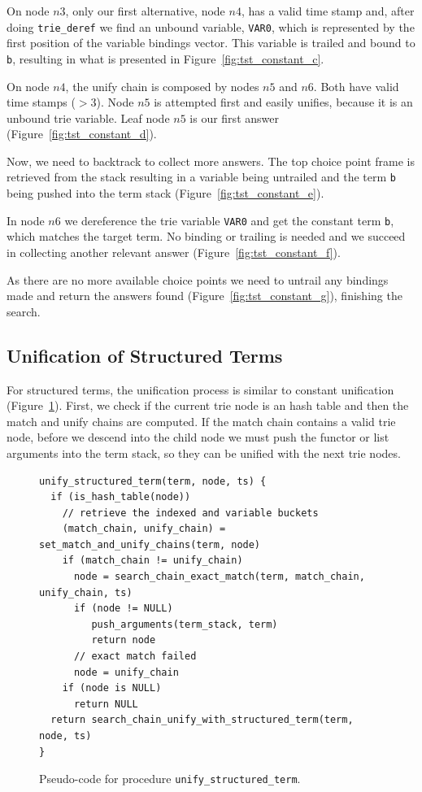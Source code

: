 On node $n3$, only our first alternative, node $n4$, has a valid time stamp and, after doing
\texttt{trie\_deref} we find an unbound variable, \texttt{VAR0}, which is represented
by the first position of the variable bindings vector.
This variable is trailed and bound to \texttt{b},
resulting in what is presented in Figure~\ref{fig:tst_constant_c}.

On node $n4$, the unify chain is composed by nodes $n5$ and $n6$. Both have valid time stamps ($> 3$).
Node $n5$ is attempted first and easily unifies, because it is an unbound trie variable.
Leaf node $n5$ is our first answer (Figure~\ref{fig:tst_constant_d}).

Now, we need to backtrack to collect more answers. The top choice point frame is retrieved from the
stack resulting in a variable being untrailed and the term \texttt{b} being pushed into the term
stack (Figure~\ref{fig:tst_constant_e}).

In node $n6$ we dereference the trie variable \texttt{VAR0} and get the constant term \texttt{b},
which matches the target term. No binding or trailing is needed and we succeed in collecting another
relevant answer (Figure~\ref{fig:tst_constant_f}).

As there are no more available choice points we need to untrail any bindings made and return
the answers found (Figure~\ref{fig:tst_constant_g}), finishing the search.

\subsection{Unification of Structured Terms}

For structured terms, the unification process is similar to constant unification
(Figure~\ref{fig:unify_structured_term}). First, we check if the current trie node is an
hash table and then the match and unify chains are computed. If the match chain contains
a valid trie node, before we descend into the child node we must push the functor or list
arguments into the term stack, so they can be unified with the next trie nodes.

\begin{figure}[ht]
\begin{Verbatim}
unify_structured_term(term, node, ts) {
  if (is_hash_table(node))
    // retrieve the indexed and variable buckets
    (match_chain, unify_chain) = set_match_and_unify_chains(term, node)
    if (match_chain != unify_chain)
      node = search_chain_exact_match(term, match_chain, unify_chain, ts)
      if (node != NULL)
         push_arguments(term_stack, term)
         return node
      // exact match failed
      node = unify_chain
    if (node is NULL)
      return NULL
  return search_chain_unify_with_structured_term(term, node, ts)
}
\end{Verbatim}
\caption{Pseudo-code for procedure \texttt{unify\_structured\_term}.}
\label{fig:unify_structured_term}
\end{figure}

